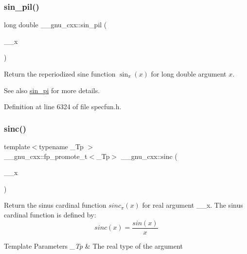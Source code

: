 \subsubsection{\texorpdfstring{sin\+\_\+pil()}{sin\_pil()}}
{\footnotesize\ttfamily long double \+\_\+\+\_\+gnu\+\_\+cxx\+::sin\+\_\+pil (\begin{DoxyParamCaption}\item[{long double}]{\+\_\+\+\_\+x }\end{DoxyParamCaption})\hspace{0.3cm}{\ttfamily [inline]}}

Return the reperiodized sine function $ \sin_\pi(x) $ for {\ttfamily long double} argument $ x $.

\begin{DoxySeeAlso}{See also}
\hyperlink{group__gnu__math__spec__func_ga220f8a9a0477697cff96e84dc911d5f0}{sin\+\_\+pi} for more details. 
\end{DoxySeeAlso}


Definition at line 6324 of file specfun.\+h.

\mbox{\label{group__gnu__math__spec__func_ga09976b5d041113979c93613cc3700348}} 
\subsubsection{\texorpdfstring{sinc()}{sinc()}}
{\footnotesize\ttfamily template$<$typename \+\_\+\+Tp $>$ \\
\+\_\+\+\_\+gnu\+\_\+cxx\+::fp\+\_\+promote\+\_\+t$<$\+\_\+\+Tp$>$ \+\_\+\+\_\+gnu\+\_\+cxx\+::sinc (\begin{DoxyParamCaption}\item[{\+\_\+\+Tp}]{\+\_\+\+\_\+x }\end{DoxyParamCaption})\hspace{0.3cm}{\ttfamily [inline]}}

Return the sinus cardinal function $ sinc_\pi(x) $ for real argument {\ttfamily \+\_\+\+\_\+x}. The sinus cardinal function is defined by\+: \[ sinc(x) = \frac{sin(x)}{x} \]


\begin{DoxyTemplParams}{Template Parameters}
{\em \+\_\+\+Tp} & The real type of the argument \\
\hline
\end{DoxyTemplParams}

